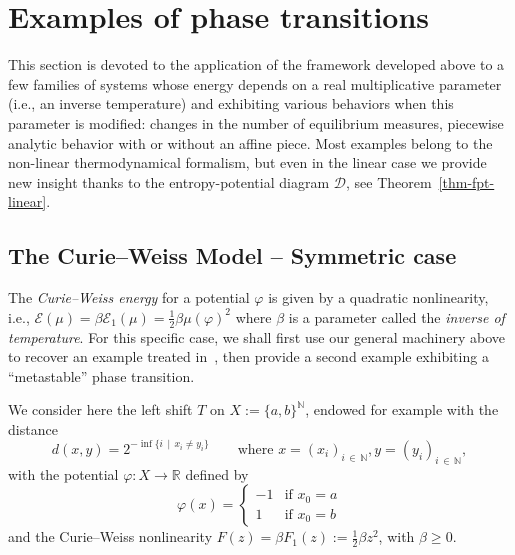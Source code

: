 \documentclass[AHL, Unicode, longabstracts,published]{cedram}
\theoremstyle{plain}
\theoremstyle{plain}
\newcommand{\pot}{\varphi}
\newcommand*\8{\infty}
\newcommand\NN{\mathbb{N}}
\newcommand\RR{\mathbb{R}}
\newcommand*\N{\mathbb{N}}
\newcommand{\En}{\mathcal{E}}
\newcommand{\cD}{\mathcal{D}}
\begin{document}
\section{Examples of phase transitions}\label{sec-examples}

This section is devoted to the application of the framework developed above to a few families of systems whose energy depends on a real multiplicative parameter (i.e., an inverse temperature) and exhibiting various behaviors when this parameter is modified: changes in the number of equilibrium measures, piecewise analytic behavior with or without an affine piece. Most examples belong to the non-linear thermodynamical formalism, but even in the linear case we provide new insight thanks to the entropy-potential diagram $\cD$, see Theorem~\ref{thm-fpt-linear}.



\subsection{The Curie--Weiss Model -- Symmetric case}\label{sec-Curie-Weiss}

The \emph{Curie--Weiss energy} for a potential $\pot$ is given by a quadratic nonlinearity, i.e., $\En(\mu) = \beta\En_1(\mu) = \frac{1}{2} \beta \mu(\pot)^2$ where $\beta$ is a parameter called the \emph{inverse of temperature}. For this specific case, we shall first use our general machinery above to recover an example treated in~\cite{Leplaideur-Watbled}, then provide a second example exhibiting a ``metastable'' phase transition.

We consider here the left shift $T$ on $X:=\{a,b\}^\N$, endowed for example with the distance
\[
d(x,y)=2^{-\inf\{i\,\mid\,x_i\neq y_i\}} \qquad \text{where } x=(x_i)_{i\,\in\,\NN}, y=(y_i)_{i\,\in\,\NN},
\]
with the potential $\pot:X\to\RR$ defined by
\[
\pot(x)=
\begin{cases}
-1 &\text{if }x_0 = a \\
1 &\text{if }x_0 = b
\end{cases}
\]
and the Curie--Weiss nonlinearity $F(z) = \beta F_1(z):=\frac{1}{2}\beta z^{2}$, with $\beta\ge 0$.
\end{document}
